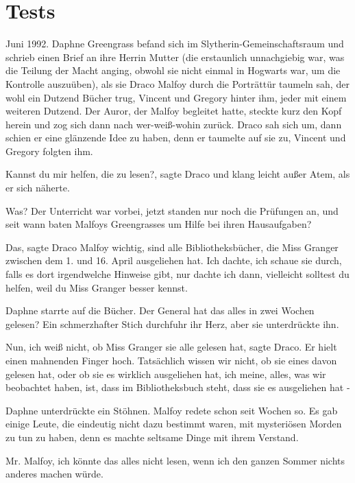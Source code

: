 \chapter{Tests}

Juni 1992. Daphne Greengrass befand sich im Slytherin-Gemeinschaftsraum und
schrieb einen Brief an ihre Herrin Mutter (die erstaunlich unnachgiebig war, was
die Teilung der Macht anging, obwohl sie nicht einmal in Hogwarts war, um die
Kontrolle auszuüben), als sie Draco Malfoy durch die Porträttür taumeln sah, der
wohl ein Dutzend Bücher trug, Vincent und Gregory hinter ihm, jeder mit einem
weiteren Dutzend. Der Auror, der Malfoy begleitet hatte, steckte kurz den Kopf
herein und zog sich dann nach wer-weiß-wohin zurück. Draco sah sich um, dann
schien er eine glänzende Idee zu haben, denn er taumelte auf sie zu, Vincent und
Gregory folgten ihm.

\glqq{}Kannst du mir helfen, die zu lesen?\grqq{}, sagte Draco und klang leicht
außer Atem, als er sich näherte.

\glqq{}Was?\grqq{} Der Unterricht war vorbei, jetzt standen nur noch die
Prüfungen an, und seit wann baten Malfoys Greengrasses um Hilfe bei ihren
Hausaufgaben?

\glqq{}Das\grqq{}, sagte Draco Malfoy wichtig, \glqq{}sind alle Bibliotheksbücher,
die Miss Granger zwischen dem 1. und 16. April ausgeliehen hat. Ich dachte, ich
schaue sie durch, falls es dort irgendwelche Hinweise gibt, nur dachte ich dann,
vielleicht solltest du helfen, weil du Miss Granger besser kennst.\grqq{}

Daphne starrte auf die Bücher. \glqq{}Der General hat das alles in zwei Wochen
gelesen?\grqq{} Ein schmerzhafter Stich durchfuhr ihr Herz, aber sie
unterdrückte ihn.

\glqq{}Nun, ich weiß nicht, ob Miss Granger sie alle gelesen hat\grqq{}, sagte
Draco. Er hielt einen mahnenden Finger hoch. \glqq{}Tatsächlich wissen wir nicht,
ob sie eines davon gelesen hat, oder ob sie es wirklich ausgeliehen hat, ich
meine, alles, was wir beobachtet haben, ist, dass im Bibliotheksbuch steht, dass
sie es ausgeliehen hat -\grqq{}

Daphne unterdrückte ein Stöhnen. Malfoy redete schon seit Wochen so. Es gab
einige Leute, die eindeutig nicht dazu bestimmt waren, mit mysteriösen Morden zu
tun zu haben, denn es machte seltsame Dinge mit ihrem Verstand.

\glqq{}Mr. Malfoy, ich könnte das alles nicht lesen, wenn ich den ganzen Sommer
nichts anderes machen würde.\grqq{}

